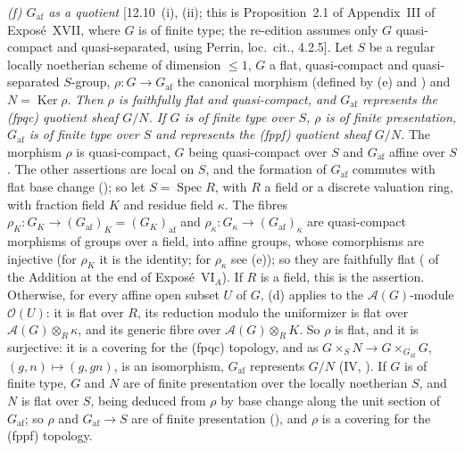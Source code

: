 \par\smallskip\noindent\textit{(f) \(G_{\mathrm{af}}\) as a quotient} [12.10~(i), (ii); this is
Proposition~2.1 of Appendix~III of Expos\'e~XVII, where \(G\) is of finite type; the re-edition
assumes only \(G\) quasi-compact and quasi-separated, using Perrin, loc.\ cit., 4.2.5]. Let
\(S\) be a regular locally noetherian scheme of dimension \(\leq1\), \(G\) a flat,
quasi-compact and quasi-separated \(S\)-group, \(\rho:G\to G_{\mathrm{af}}\) the canonical
morphism (defined by (e) and ) and
\(N=\operatorname{Ker}\rho\). \emph{Then \(\rho\) is faithfully flat and quasi-compact, and
\(G_{\mathrm{af}}\) represents the \textup{(fpqc)} quotient sheaf \(G/N\). If \(G\) is of finite
type over \(S\), \(\rho\) is of finite presentation, \(G_{\mathrm{af}}\) is of finite type over
\(S\) and represents the \textup{(fppf)} quotient sheaf \(G/N\).} The morphism \(\rho\) is
quasi-compact, \(G\) being quasi-compact over \(S\) and \(G_{\mathrm{af}}\) affine over \(S\).
The other assertions are local on \(S\), and the formation of \(G_{\mathrm{af}}\) commutes with
flat base change (); so let \(S=\operatorname{Spec}R\), with
\(R\) a field or a discrete valuation ring, with fraction field \(K\) and residue field
\(\kappa\). The fibres \(\rho_K:G_K\to(G_{\mathrm{af}})_K=(G_K)_{\mathrm{af}}\) and
\(\rho_\kappa:G_\kappa\to(G_{\mathrm{af}})_\kappa\) are quasi-compact morphisms of groups over a
field, into affine groups, whose comorphisms are injective (for \(\rho_K\) it is the identity;
for \(\rho_\kappa\) see (e)); so they are faithfully flat ( of
the Addition at the end of Expos\'e~VI\(_A\)). If \(R\) is a field, this is the assertion.
Otherwise, for every affine open subset \(U\) of \(G\), (d) applies to the
\(\mathcal A(G)\)-module \(\mathcal O(U)\): it is flat over \(R\), its reduction modulo the
uniformizer is flat over \(\mathcal A(G)\otimes_R\kappa\), and its generic fibre over
\(\mathcal A(G)\otimes_RK\). So \(\rho\) is flat, and it is surjective: it is a covering for
the \textup{(fpqc)} topology, and as \(G\times_SN\to G\times_{G_{\mathrm{af}}}G\),
\((g,n)\mapsto(g,gn)\), is an isomorphism, \(G_{\mathrm{af}}\) represents \(G/N\) (IV,
). If \(G\) is of finite type, \(G\) and \(N\) are
of finite presentation over the locally noetherian \(S\), and \(N\) is flat over \(S\), being
deduced from \(\rho\) by base change along the unit section of \(G_{\mathrm{af}}\); so \(\rho\)
and \(G_{\mathrm{af}}\to S\) are of finite presentation
(), and \(\rho\) is a covering for the
\textup{(fppf)} topology.

